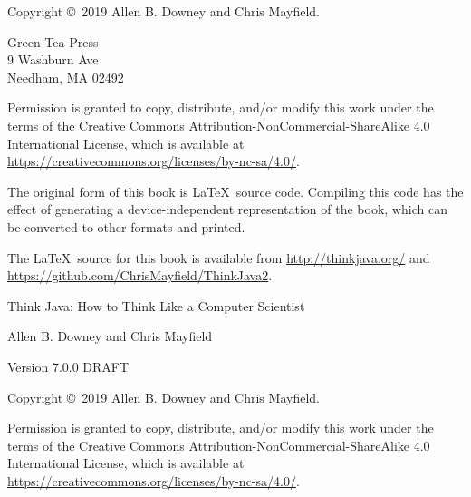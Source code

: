 \documentclass[12pt]{book}
\newcommand{\thetitle}{Think Java}
\newcommand{\thesubtitle}{How to Think Like a Computer Scientist}
\newcommand{\theauthors}{Allen B. Downey and Chris Mayfield}
\newcommand{\theversion}{7.0.0 DRAFT}
\theoremstyle{exercise}
\begin{document}
\begin{latexonly}
\newpage
\thispagestyle{empty}

Copyright \copyright ~2019 \theauthors.

\vspace{0.2in}

\begin{flushleft}
Green Tea Press \\
9 Washburn Ave \\
Needham, MA 02492
\end{flushleft}

Permission is granted to copy, distribute, and/or modify this work under the terms of the Creative Commons Attribution-NonCommercial-ShareAlike 4.0 International License, which is available at \url{https://creativecommons.org/licenses/by-nc-sa/4.0/}.

The original form of this book is \LaTeX\ source code.
Compiling this code has the effect of generating a device-independent representation of the book, which can be converted to other formats and printed.

The \LaTeX\ source for this book is available from \url{http://thinkjava.org/} and \url{https://github.com/ChrisMayfield/ThinkJava2}.


\cleardoublepage
\setcounter{tocdepth}{1}
\tableofcontents

\end{latexonly}


\begin{htmlonly}

\vspace{1em}

{\Large \thetitle: \thesubtitle}

{\large \theauthors}

Version \theversion

\vspace{1em}

Copyright \copyright ~2019 \theauthors.

Permission is granted to copy, distribute, and/or modify this work under the terms of the Creative Commons Attribution-NonCommercial-ShareAlike 4.0 International License, which is available at \url{https://creativecommons.org/licenses/by-nc-sa/4.0/}.

\vspace{1em}

\end{htmlonly}
\end{document}
